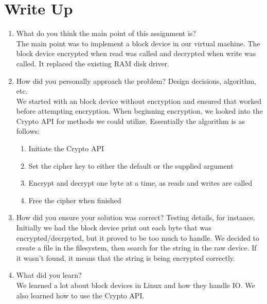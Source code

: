 \documentclass[letterpaper,10pt,draftclsnofoot,onecolumn,titlepage]{IEEEtran}
\begin{document}
\section{Write Up}
\begin{enumerate}
                \item What do you think the main point of this assignment is? \\
The main point was to implement a block device in our virtual machine. The block device encrypted when read was called and decrypted when write was called. It replaced the existing RAM disk driver.
                \item How did you personally approach the problem? Design decisions, algorithm, etc. \\
We started with an block device without encryption and ensured that worked before attempting encryption. When beginning encryption, we looked into the Crypto API for methods we could utilize. Essentially the algorithm is as follows:
\begin{enumerate}
   \item Initiate the Crypto API
   \item Set the cipher key to either the default or the supplied argument
   \item Encrypt and decrypt one byte at a time, as reads and writes are called
   \item Free the cipher when finished
\end{enumerate}

                \item How did you ensure your solution was correct? Testing details, for instance. \\
Initially we had the block device print out each byte that was encrypted/decrpyted, but it proved to be too much to handle. We decided to create a file in the filesystem, then search for the string in the raw device. If it wasn't found, it means that the string is being encrypted correctly.
                \item What did you learn? \\
We learned a lot about block devices in Linux and how they handle IO. We also learned how to use the Crypto API.
\end{enumerate}
\end{document}
